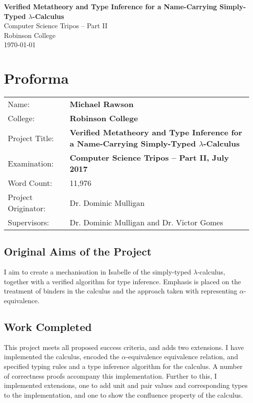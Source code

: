 \documentclass[12pt,a4paper,twoside,openright]{report}
\author{Michael Rawson}
\date{2016--17}
\newcommand{\thetitle}{Verified Metatheory and Type Inference for a Name-Carrying Simply-Typed \(\lambda\)-Calculus}
\begin{document}
\pagestyle{empty}
\vspace*{60mm}
\begin{center}
\Huge
\textbf{\thetitle}\\[5mm]
Computer Science Tripos -- Part II\\[5mm]
Robinson College\\[5mm]
\today
\end{center}

\pagestyle{plain}
\chapter*{Proforma}
{\large
\begin{tabular}{p{}p{}}
Name:              & \bf Michael Rawson\\
College:           & \bf Robinson College\\
Project Title:     & \bf \thetitle\\
Examination:       & \bf Computer Science Tripos -- Part II, July 2017\\
Word Count:        & 11,976\footnotemark[1]\\
Project Originator:& Dr. Dominic Mulligan\\
Supervisors:       & Dr. Dominic Mulligan and Dr. Victor Gomes\\
\end{tabular}
}

\section*{Original Aims of the Project}
I aim to create a mechanisation in Isabelle of the simply-typed \(\lambda\)-calculus, together with a verified algorithm for type inference.
Emphasis is placed on the treatment of binders in the calculus and the approach taken with representing \(\alpha\)-equivalence.

\section*{Work Completed}
This project meets all proposed success criteria, and adds two extensions.
I have implemented the calculus, encoded the \(\alpha\)-equivalence equivalence relation, and specified typing rules and a type inference algorithm for the calculus.
A number of correctness proofs accompany this implementation.
Further to this, I implemented extensions, one to add unit and pair values and corresponding types to the implementation, and one to show the confluence property of the calculus.
\end{document}
